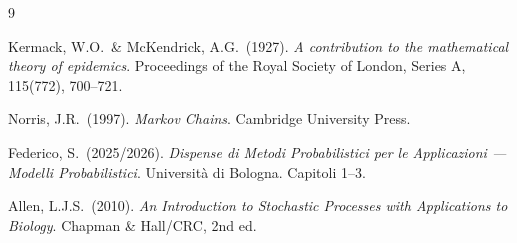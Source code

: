 \documentclass[11pt, a4paper]{article}
\theoremstyle{plain}
\theoremstyle{definition}
\theoremstyle{remark}
\begin{document}
\newpage

\begin{thebibliography}{9}

Kermack, W.O.\ \& McKendrick, A.G.\ (1927).
\textit{A contribution to the mathematical theory of epidemics}.
Proceedings of the Royal Society of London, Series A, 115(772), 700--721.

Norris, J.R.\ (1997).
\textit{Markov Chains}.
Cambridge University Press.

Federico, S.\ (2025/2026).
\textit{Dispense di Metodi Probabilistici per le Applicazioni --- Modelli Probabilistici}.
Università di Bologna. Capitoli 1--3.

Allen, L.J.S.\ (2010).
\textit{An Introduction to Stochastic Processes with Applications to Biology}.
Chapman \& Hall/CRC, 2nd ed.

\end{thebibliography}
\end{document}
